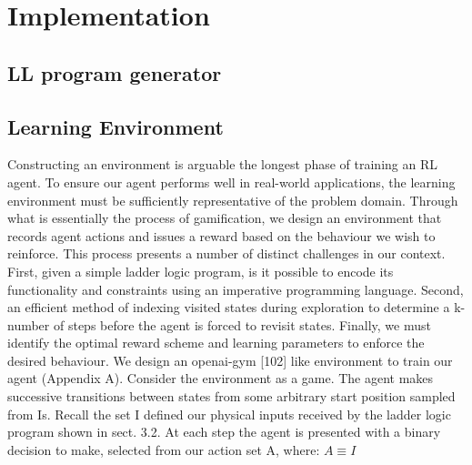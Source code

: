 \documentclass[runningheads]{llncs}
\begin{document}
\section{Implementation}
\subsection{LL program generator}
\subsection{Learning Environment}
Constructing an environment is arguable the longest phase of training an RL agent. To
ensure our agent performs well in real-world applications, the learning environment must
be sufficiently representative of the problem domain. Through what is essentially the
process of gamification, we design an environment that records agent actions and issues a
reward based on the behaviour we wish to reinforce. This process presents a number of
distinct challenges in our context. First, given a simple ladder logic program, is it possible
to encode its functionality and constraints using an imperative programming language.
Second, an efficient method of indexing visited states during exploration to determine a
k-number of steps before the agent is forced to revisit states. Finally, we must identify the
optimal reward scheme and learning parameters to enforce the desired behaviour. We design an openai-gym [102] like environment to train our agent (Appendix A).
Consider the environment as a game. The agent makes successive transitions between
states from some arbitrary start position sampled from Is. Recall the set I  defined our physical inputs received by the ladder logic program shown in sect. 3.2. At each step the
agent is presented with a binary decision to make, selected from our action set A, where: $A \equiv I$
\end{document}
